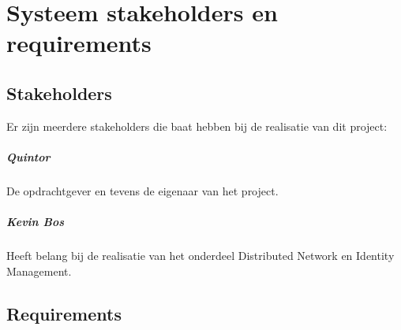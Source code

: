 \chapter{Systeem stakeholders en requirements}

\section{Stakeholders}

Er zijn meerdere stakeholders die baat hebben bij de realisatie van dit project:

\paragraph{Quintor} De opdrachtgever en tevens de eigenaar van het project.

\paragraph{Kevin Bos} Heeft belang bij de realisatie van het onderdeel Distributed Network en Identity Management.

\section{Requirements}

